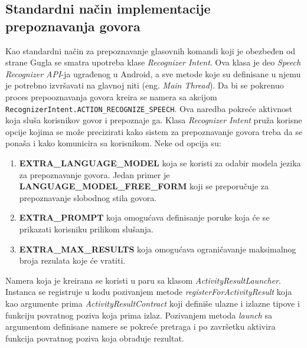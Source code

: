 \documentclass[struktura.tex]{subfiles}
\begin{document}
\subsection{Standardni način implementacije prepoznavanja govora}
Kao standardni način za prepoznavanje glasovnih komandi koji je obezbeđen od strane Gugla se smatra upotreba klase \textit{Recognizer Intent}. Ova klasa je deo \textit{Speech Recognizer API}-ja ugrađenog u Android, a sve metode koje su definisane u njemu je potrebno izvršavati na glavnoj niti (eng. \textit{Main Thread}). Da bi se pokrenuo proces prepooznavanja govora kreira se namera sa akcijom \lstinline!RecognizerIntent.ACTION_RECOGNIZE_SPEECH!. Ova naredba pokreće aktivnost koja sluša korisnikov govor i prepoznaje ga. Klasa \textit{Recognizer Intent} pruža korisne opcije kojima se može precizirati kako sistem za prepoznavanje govora treba da se ponaša i kako komunicira sa korisnikom. Neke od opcija su:
\begin{enumerate}
    \item \textbf{EXTRA\_LANGUAGE\_MODEL} koja se koristi za odabir modela jezika za prepoznavanje govora. Jedan primer je \textbf{LANGUAGE\_MODEL\_FREE\_FORM} koji se preporučuje za prepoznavanje slobodnog stila govora.
    \item \textbf{EXTRA\_PROMPT} koja omogućava definisanje poruke koja će se prikazati korisniku prilikom slušanja.
    \item \textbf{EXTRA\_MAX\_RESULTS} koja omogućava ograničavanje maksimalnog broja rezulata koje će vratiti.
\end{enumerate}

Namera koja je kreirana se koristi u paru sa klasom \textit{ActivityResultLauncher}. Instanca se registruje u kodu pozivanjem metode \textit{registerForActivityResult} koja kao argumente prima \textit{ActivityResultContract} koji definiše ulazne i izlazne tipove i funkciju povratnog poziva koja prima izlaz. Pozivanjem metoda \textit{launch} sa argumentom definisane namere se pokreće pretraga i po završetku aktivira funkcija povratnog poziva koja obrađuje rezultat.
\end{document}
